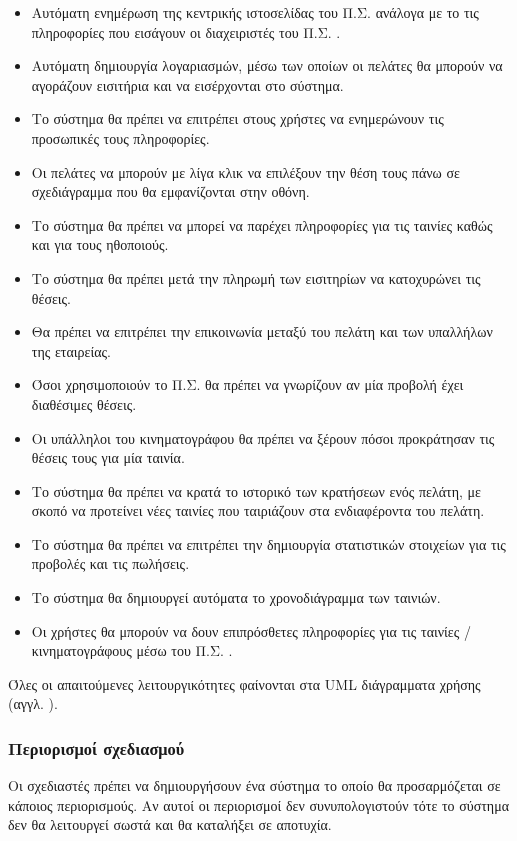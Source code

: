 \documentclass{assignment}
\begin{document}
\begin{itemize}
\item Αυτόματη ενημέρωση της κεντρικής ιστοσελίδας του Π.Σ. ανάλογα με το τις πληροφορίες που εισάγουν οι διαχειριστές του Π.Σ. .
\item Αυτόματη δημιουργία λογαριασμών, μέσω των οποίων οι πελάτες θα μπορούν να αγοράζουν εισιτήρια και να εισέρχονται στο σύστημα.
\item Το σύστημα θα πρέπει να επιτρέπει στους χρήστες να ενημερώνουν τις προσωπικές τους πληροφορίες.
\item Οι πελάτες να μπορούν με λίγα κλικ να επιλέξουν την θέση τους πάνω σε σχεδιάγραμμα που θα εμφανίζονται στην οθόνη.
\item Το σύστημα θα πρέπει να μπορεί να παρέχει πληροφορίες για τις ταινίες καθώς και για τους ηθοποιούς.
\item Το σύστημα θα πρέπει μετά την πληρωμή των εισιτηρίων να κατοχυρώνει τις θέσεις. 
\item Θα πρέπει να επιτρέπει την επικοινωνία μεταξύ του πελάτη και των υπαλλήλων της εταιρείας. 
\item Όσοι χρησιμοποιούν το Π.Σ. θα πρέπει να γνωρίζουν αν μία προβολή έχει διαθέσιμες θέσεις.
\item Οι υπάλληλοι του κινηματογράφου θα πρέπει να ξέρουν πόσοι προκράτησαν τις θέσεις τους για μία ταινία.
\item Το σύστημα θα πρέπει να κρατά το ιστορικό των κρατήσεων ενός πελάτη, με σκοπό να προτείνει νέες ταινίες που ταιριάζουν στα ενδιαφέροντα του πελάτη.
\item Το σύστημα θα πρέπει να επιτρέπει την δημιουργία στατιστικών στοιχείων για τις προβολές και τις πωλήσεις.
\item Το σύστημα θα δημιουργεί αυτόματα το χρονοδιάγραμμα των ταινιών.
\item Οι χρήστες θα μπορούν να δουν επιπρόσθετες πληροφορίες για τις ταινίες / κινηματογράφους μέσω του Π.Σ. .
\end{itemize}

Όλες οι απαιτούμενες λειτουργικότητες φαίνονται στα UML διάγραμματα χρήσης (αγγλ. ).

\subsubsection{Περιορισμοί σχεδιασμού}

Οι σχεδιαστές πρέπει να δημιουργήσουν ένα σύστημα το οποίο θα προσαρμόζεται σε κάποιος περιορισμούς. Αν αυτοί οι περιορισμοί δεν συνυπολογιστούν τότε το σύστημα δεν θα λειτουργεί σωστά και θα καταλήξει σε αποτυχία. 
\end{document}
